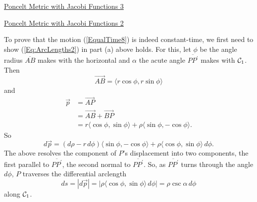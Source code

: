 \documentclass{ximera}
\begin{document}
\begin{exploration}
\begin{onlineOnly}
    \begin{center}
\end{center}
\end{onlineOnly}

\href{https://www.desmos.com/calculator/l7oadgwyva}{Poncelt Metric with Jacobi Functions 3} %
\end{exploration}


\begin{exploration}
\begin{onlineOnly}
    \begin{center}
\end{center}
\end{onlineOnly}

\href{https://www.desmos.com/calculator/hm5zop04ob}{Poncelt Metric with Jacobi Functions 2}
\end{exploration}

To prove that the motion (\ref{EqualTime8}) is indeed constant-time, we first need to show (\ref{Eq:ArcLengths2}) in part (a) above holds. For this, let $\phi$ be the angle radius $\overline{AB}$ makes with the horizontal and $\alpha$ the acute angle $\overline{PP^\prime}$ makes with ${\cal C}_1$. Then 
\[
      \overrightarrow{AB} = \langle r\cos \phi, r\sin\phi \rangle
\]
and
\begin{align*}
    \overrightarrow{p} &= \overrightarrow{AP}   \\
                                &= \overrightarrow{AB}+\overrightarrow{BP} \\
                                &= r\langle \cos \phi, \sin \phi \rangle + \rho \langle \sin\phi, -\cos\phi  \rangle . 
\end{align*}
So
\[
    d\overrightarrow{p} = (d\rho - r \, d\phi ) \langle \sin \phi, -\cos \phi \rangle+ \rho \langle \cos\phi, \sin\phi \rangle \, d\phi .
\]
The above resolves the component of $P$'s displacement into two components, the first parallel to $\overline{PP^\prime}$, the second normal to $\overline{PP^\prime}$. So, as $\overline{PP^\prime}$ turns through the angle $d\phi$, $P$ traverses the differential arclength
\[
   ds = |d\overrightarrow{p}| = |  \rho \langle \cos\phi, \sin\phi \rangle \, d\phi |    = \rho \csc \alpha \, d\phi
\]
along ${\cal C}_1$. 
\end{document}
